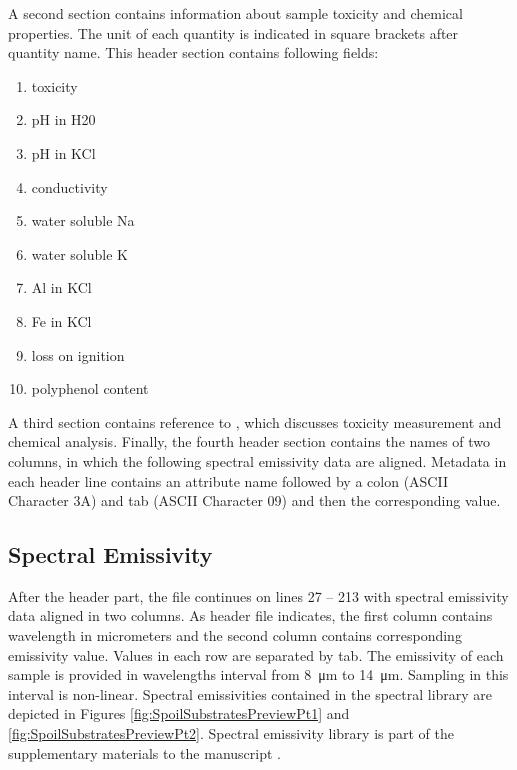 \begin{appendices}
A second section contains information about sample toxicity and chemical properties. The unit of each quantity is indicated in square brackets after quantity name. This header section contains following fields:

\begin{enumerate}
	\item toxicity
	\item pH in H20
	\item pH in KCl
	\item conductivity
	\item water soluble Na
	\item water soluble K
	\item Al in KCl
	\item Fe in KCl
	\item loss on ignition
	\item polyphenol content
\end{enumerate}

A third section contains reference to \cite{FK05}, which discusses toxicity measurement and chemical analysis. Finally, the fourth header section contains the names of two columns, in which the following spectral emissivity data are aligned. Metadata in each header line contains an attribute name followed by a colon (ASCII Character 3A) and tab (ASCII Character 09) and then the corresponding value.

\subsection{Spectral Emissivity}

After the header part, the file continues on lines 27 – 213 with spectral emissivity data aligned in two columns. As header file indicates, the first column contains wavelength in micrometers and the second column contains corresponding emissivity value. Values in each row are separated by tab. The emissivity of each sample is provided in wavelengths interval from \SI{8}{\micro\meter} to \SI{14}{\micro\meter}. Sampling in this interval is non-linear. Spectral emissivities contained in the spectral library are depicted in Figures \ref{fig:SpoilSubstratesPreviewPt1} and \ref{fig:SpoilSubstratesPreviewPt2}. Spectral emissivity library is part of the supplementary materials to the manuscript \cite{PP16}.


\end{appendices}
